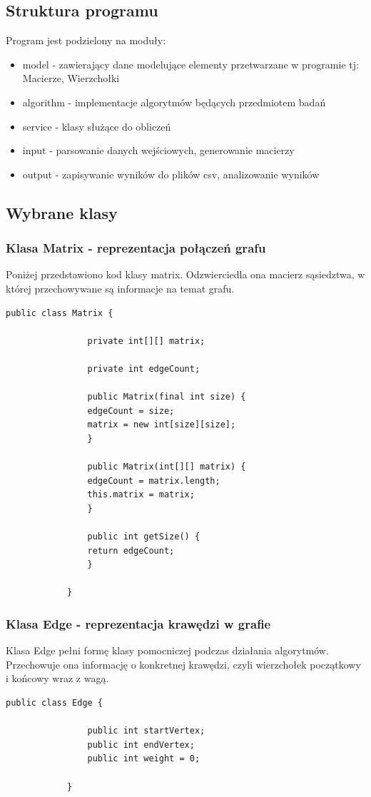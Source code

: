 \documentclass{article}
\begin{document}
		\subsection{Struktura programu}	
		Program jest podzielony na moduły:
		\begin{itemize}
			\item model - zawierający dane modelujące elementy przetwarzane w programie tj: Macierze, Wierzchołki
			\item algorithm - implementacje algorytmów będących przedmiotem badań
			\item service - klasy służące do obliczeń
			\item input - parsowanie danych wejściowych, generowanie macierzy
			\item output - zapisywanie wyników do plików csv, analizowanie wyników
		\end{itemize}
	\subsection{Wybrane klasy}
	
		\subsubsection{Klasa Matrix - reprezentacja połączeń grafu}
			Poniżej przedstawiono kod klasy matrix. Odzwierciedla ona macierz sąsiedztwa, w której przechowywane są informacje na temat grafu.
			
			\begin{lstlisting}[xleftmargin=-100pt]
			public class Matrix {
			
				private int[][] matrix;
			
				private int edgeCount;
				
				public Matrix(final int size) {
				edgeCount = size;
				matrix = new int[size][size];
				}
				
				public Matrix(int[][] matrix) {
				edgeCount = matrix.length;
				this.matrix = matrix;
				}
										
				public int getSize() {
				return edgeCount;
				}
				
			}
			\end{lstlisting}
		\subsubsection{Klasa Edge - reprezentacja krawędzi w grafie}
		
		Klasa Edge pełni formę klasy pomocniczej podczas działania algorytmów. Przechowuje ona informację o konkretnej krawędzi, czyli wierzchołek początkowy i końcowy wraz z wagą.
			\begin{lstlisting}[xleftmargin=-100pt]
			public class Edge {
			
				public int startVertex;
				public int endVertex;
				public int weight = 0;
						
			}
			
			\end{lstlisting}
\end{document}
